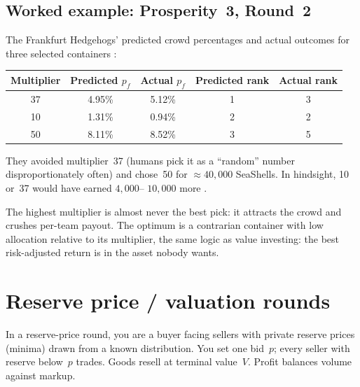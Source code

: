 \subsection{Worked example: Prosperity~3, Round~2}

The Frankfurt Hedgehogs' predicted crowd percentages and actual
outcomes for three selected containers
\citep{frankfurtHedgehogs2025imcP3}:

\medskip
\begin{center}
\begin{tabular}{c c c c c}
\toprule
\textbf{Multiplier} & \textbf{Predicted $p_f$} & \textbf{Actual $p_f$} & \textbf{Predicted rank} & \textbf{Actual rank} \\
\midrule
37 & 4.95\% & 5.12\% & 1 & 3 \\
10 & 1.31\% & 0.94\% & 2 & 2 \\
50 & 8.11\% & 8.52\% & 3 & 5 \\
\bottomrule
\end{tabular}
\end{center}
\medskip

\noindent
They avoided multiplier~37 (humans pick it as a ``random'' number
disproportionately often) and chose~50 for $\approx 40{,}000$
SeaShells.  In hindsight, 10 or~37 would have earned $4{,}000$--%
$10{,}000$ more \citep{frankfurtHedgehogs2025imcP3}.

\begin{pitfallbox}
The highest multiplier is almost never the best pick: it attracts
the crowd and crushes per-team payout.  The optimum is a
contrarian container with low allocation relative to its multiplier,
the same logic as value investing: the best risk-adjusted return
is in the asset nobody wants.
\end{pitfallbox}


\section{Reserve price / valuation rounds}
\label{sec:ch25_reserve_price}

In a reserve-price round, you are a buyer facing sellers with
private reserve prices (minima) drawn from a known distribution.
You set one bid~$p$; every seller with reserve below~$p$ trades.
Goods resell at terminal value~$V$.  Profit balances volume
against markup.

